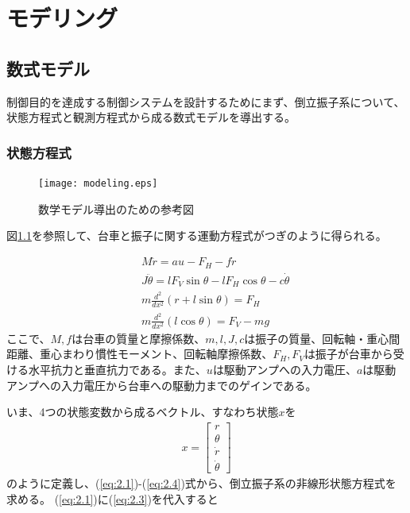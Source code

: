 \documentclass[a4j,11pt,twoside]{ujbook}
\begin{document}
\chapter{モデリング}
	\section{数式モデル}
		制御目的を達成する制御システムを設計するためにまず、倒立振子系について、状態方程式と観測方程式から成る数式モデルを導出する。
		\subsection{状態方程式}
			\begin{figure}[htbp]
				\begin{center}
					\texttt{[image: modeling.eps]}
					\caption{数学モデル導出のための参考図}
					\label{fig:数式モデル導出のための参考図}
				\end{center}
			\end{figure}

			図\ref{fig:数式モデル導出のための参考図}を参照して、台車と振子に関する運動方程式がつぎのように得られる。

			\begin{eqnarray}
			&&M \ddot{r} = au - F_H - f \dot{r}
			\label{eq:2.1}\\
			&&J \ddot{\theta} = lF_V\sin{\theta} - lF_H\cos{\theta} - c\dot{\theta}
			\label{eq:2.2}\\
			&&m \frac{d^2}{dx^2} (r + l\sin{\theta})  =  F_H
			\label{eq:2.3}\\
			&&m \frac{d^2}{dx^2} (l\cos{\theta})  =  F_V - mg
			\label{eq:2.4}
			\end{eqnarray}
			ここで、$M,f$は台車の質量と摩擦係数、$m,l,J,c$は振子の質量、回転軸・重心間距離、重心まわり慣性モーメント、回転軸摩擦係数、$F_H,F_V$は振子が台車から受ける水平抗力と垂直抗力である。また、$u$は駆動アンプへの入力電圧、$a$は駆動アンプへの入力電圧から台車への駆動力までのゲインである。

			いま、4つの状態変数から成るベクトル、すなわち状態$x$を
			\begin{eqnarray*}
				x=\left[
				\begin{array}{c}
					r\\
					\theta\\
					\dot{r}\\
					\dot{\theta}
				\end{array}
				\right]
			\end{eqnarray*}
			のように定義し、(\ref{eq:2.1})-(\ref{eq:2.4})式から、倒立振子系の非線形状態方程式を求める。
			(\ref{eq:2.1})に(\ref{eq:2.3})を代入すると
\end{document}
